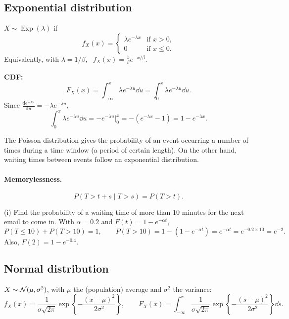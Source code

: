 \subsection{Exponential distribution}
$X \sim \operatorname{Exp}(\lambda)$ if
\[
f_X(x) =
\begin{cases}
\lambda e^{-\lambda x} & \text{if } x > 0,\\
0 & \text{if } x \le 0.
\end{cases}
\]
Equivalently, with $\lambda = 1/\beta$, \ $f_X(x) = \frac{1}{\beta}e^{-x/\beta}$.

\textbf{CDF:}
\[
F_X(x) = \int_{-\infty}^{x}\lambda e^{-\lambda u}\dd u = \int_{0}^{x}\lambda e^{-\lambda u}\dd u.
\]
Since $\frac{\mathrm{d}e^{-\lambda u}}{\mathrm{d}u} = -\lambda e^{-\lambda u}$,
\[
\int_0^x \lambda e^{-\lambda u}\dd u = -e^{-\lambda u}\Big|_0^x = -(e^{-\lambda x} - 1) = 1 - e^{-\lambda x}.
\]

The Poisson distribution gives the probability of an event occurring a number of times during a time window (a period of certain length). On the other hand, waiting times between events follow an exponential distribution.

\paragraph{Memorylessness.}
\[
P(T > t + s \mid T > s) = P(T > t).
\]

\begin{example}
(i) Find the probability of a waiting time of more than $10$ minutes for the next email to come in. With $\alpha = 0.2$ and $F(t) = 1 - e^{-\alpha t}$,
\[
P(T \le 10) + P(T > 10) = 1,
\qquad
P(T > 10) = 1 - (1 - e^{-\alpha t}) = e^{-\alpha t} = e^{-0.2\times 10} = e^{-2}.
\]
Also, $F(2) = 1 - e^{-0.4}$.
\end{example}

\subsection{Normal distribution}
$X \sim \mathcal{N}(\mu, \sigma^2)$, with $\mu$ the (population) average and $\sigma^2$ the variance:
\[
f_X(x) = \frac{1}{\sigma\sqrt{2\pi}}\exp\left\{-\frac{(x-\mu)^2}{2\sigma^2}\right\},
\qquad
F_X(x) = \int_{-\infty}^{x}\frac{1}{\sigma\sqrt{2\pi}}\exp\left\{-\frac{(s-\mu)^2}{2\sigma^2}\right\}\dd s.
\]
\begin{center}
\end{center}

